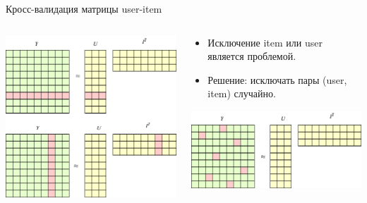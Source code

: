 \documentclass[11pt,aspectratio=169,handout]{beamer}
\begin{document}
\begin{frame}{Кросс-валидация матрицы user-item}

\begin{columns}
\begin{column}{0.5\textwidth}
   \begin{center}
		\includegraphics[scale=0.38]{images/user-item-cross-validation-Page-1.png}
   \end{center}
\end{column}
\begin{column}{0.5\textwidth}
    \begin{tcolorbox}[colback=info!5,colframe=info!80,title=]
      \begin{itemize}
      \item Исключение item или user является проблемой.
      \item Решение: исключать пары (user, item) случайно.
      \end{itemize}
    \end{tcolorbox}
    \begin{center}
		\includegraphics[scale=0.38]{images/user-item-cross-validation-Page-2.png}
   \end{center}
\end{column}
\end{columns}

\end{frame}
\end{document}
